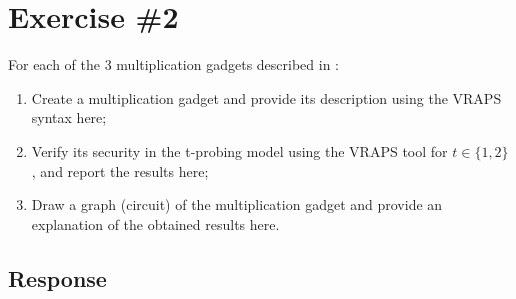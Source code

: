 \documentclass{article}
\begin{document}
\section*{Exercise \#2}

For each of the 3 multiplication gadgets described in \cite[Sec.3, p.11]{DBLP:conf/crypto/BelaidCPRT20}:
\begin{enumerate}
  \item Create a multiplication gadget and provide its description using the VRAPS syntax here;
  \item Verify its security in the t-probing model using the VRAPS tool for $t\in\{1,2\}$, and report the results here;
  \item Draw a graph (circuit) of the multiplication gadget and provide an explanation of the obtained results here.
\end{enumerate}

\subsection*{Response}
\end{document}
